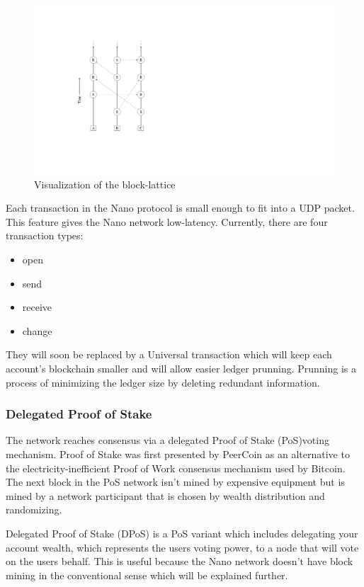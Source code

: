 \documentclass{ferseminar}
\begin{document}
\begin{figure}
	\caption{Visualization of the block-lattice \cite{Nano}}
	\includegraphics[scale=0.6]{lattice}
	\centering
\end{figure}

Each transaction in the Nano protocol is small enough to fit into a UDP packet. This feature gives the Nano network low-latency. Currently, there are four transaction types: 
\begin{itemize}
	\item open
	\item send
	\item receive
	\item change
\end{itemize}

They will soon be replaced by a Universal transaction which will keep each account's blockchain smaller and will allow easier ledger prunning. Prunning is a process of minimizing the ledger size by deleting redundant information.  


\subsubsection{Delegated Proof of Stake}

The network reaches consensus via a delegated Proof of Stake (PoS)voting mechanism. Proof of Stake was first presented by PeerCoin \cite{Peercoin} as an alternative to the electricity-inefficient Proof of Work consensus mechanism used by Bitcoin. The next block in the PoS network isn't mined by expensive equipment but is mined by a network participant that is chosen by wealth distribution and randomizing.

Delegated Proof of Stake (DPoS) is a PoS variant which includes delegating your account wealth, which represents the users voting power, to a node that will vote on the users behalf. This is useful because the Nano network doesn't have block mining in the conventional sense which will be explained further. 
\end{document}
